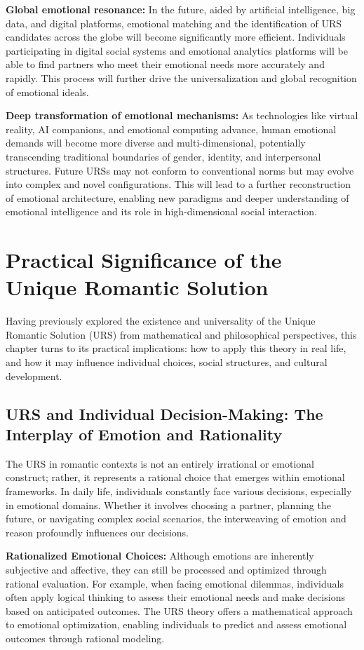 \documentclass[12pt]{article}
\begin{document}
\textbf{Global emotional resonance:} In the future, aided by artificial intelligence, big data, and digital platforms, emotional matching and the identification of URS candidates across the globe will become significantly more efficient. Individuals participating in digital social systems and emotional analytics platforms will be able to find partners who meet their emotional needs more accurately and rapidly. This process will further drive the universalization and global recognition of emotional ideals.

\textbf{Deep transformation of emotional mechanisms:} As technologies like virtual reality, AI companions, and emotional computing advance, human emotional demands will become more diverse and multi-dimensional, potentially transcending traditional boundaries of gender, identity, and interpersonal structures. Future URSs may not conform to conventional norms but may evolve into complex and novel configurations. This will lead to a further reconstruction of emotional architecture, enabling new paradigms and deeper understanding of emotional intelligence and its role in high-dimensional social interaction.
\section{Practical Significance of the Unique Romantic Solution}

Having previously explored the existence and universality of the Unique Romantic Solution (URS) from mathematical and philosophical perspectives, this chapter turns to its practical implications: how to apply this theory in real life, and how it may influence individual choices, social structures, and cultural development.

\subsection{URS and Individual Decision-Making: The Interplay of Emotion and Rationality}

The URS in romantic contexts is not an entirely irrational or emotional construct; rather, it represents a rational choice that emerges within emotional frameworks. In daily life, individuals constantly face various decisions, especially in emotional domains. Whether it involves choosing a partner, planning the future, or navigating complex social scenarios, the interweaving of emotion and reason profoundly influences our decisions.

\textbf{Rationalized Emotional Choices:} Although emotions are inherently subjective and affective, they can still be processed and optimized through rational evaluation. For example, when facing emotional dilemmas, individuals often apply logical thinking to assess their emotional needs and make decisions based on anticipated outcomes. The URS theory offers a mathematical approach to emotional optimization, enabling individuals to predict and assess emotional outcomes through rational modeling.
\end{document}
